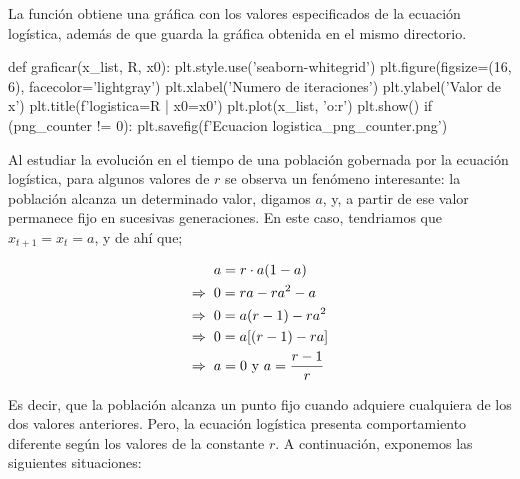 \documentclass[10pt,a4paper]{article}
\begin{document}
La función obtiene una gráfica con los valores especificados de la ecuación logística, además de que guarda la gráfica obtenida en el mismo directorio.

\begin{python}
def graficar(x_list, R, x0):
    plt.style.use('seaborn-whitegrid')
    plt.figure(figsize=(16, 6), facecolor='lightgray')
    plt.xlabel('Numero de iteraciones')
    plt.ylabel('Valor de x')
    plt.title(f'\nEcuacion logistica\n\nR={R}  |  x0={x0}\n')
    plt.plot(x_list, 'o:r')
    plt.show()
    if (png_counter != 0):
        plt.savefig(f'Ecuacion logistica_{png_counter}.png')
\end{python}

Al estudiar la evolución en el tiempo de una población gobernada por la ecuación logística, para algunos valores de $r$ se observa un fenómeno interesante: la población alcanza un determinado valor, digamos $a$, y, a partir de ese valor permanece fijo en sucesivas generaciones. En este caso, tendriamos que $x_{t+1} = x_t =  a$, y de ahí que;

\begin{align*}
& a = r \cdot a (1 - a) \\
\Rightarrow \hspace{.2cm} &  0 = r a - r a^2 - a \\
\Rightarrow \hspace{.2cm} & 0 = a(r - 1) - r a^2 \\
\Rightarrow \hspace{.2cm} & 0 = a [(r - 1) - r a] \\
\Rightarrow \hspace{.2cm} & a = 0 \text{ y } a = \frac{r - 1}{r}
\end{align*}

Es decir, que la población alcanza un punto fijo cuando adquiere cualquiera de los dos valores anteriores. Pero, la ecuación logística presenta comportamiento diferente según los valores de la constante $r$. A continuación, exponemos las siguientes situaciones:
\end{document}
